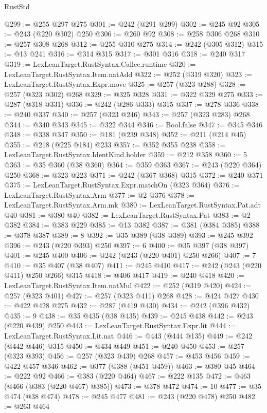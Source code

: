 \begin{lexlean}{RustStd}
\begin{coremodule}
@299 := @255 @297 @275
@301 := @242 (@291 @299)
@302 := @245 @92
@305 := @243 (@220 @302) @250
@306 := @260 @92
@308 := @258 @306 @268
@310 := @257 @308 @268
@312 := @255 @310 @275
@314 := @242 (@305 @312)
@315 := @13 @241
@316 := @314 @315
@317 := @301 @316
@318 := @240 @317
@319 := LexLeanTarget.RustSyntax.Callee.runtime
@320 := LexLeanTarget.RustSyntax.Item.natAdd
@322 := @252 (@319 @320)
@323 := LexLeanTarget.RustSyntax.Expr.move
@325 := @257 (@323 @288)
@328 := @257 (@323 @302) @268
@329 := @325 @328
@331 := @322 @329 @275
@333 := @287 (@318 @331)
@336 := @242 (@286 @333) @315
@337 := @278 @336
@338 := @240 @337
@340 := @257 (@323 @246)
@343 := @257 (@323 @283) @268
@344 := @340 @343
@345 := @322 @344
@346 := Bool.false
@347 := @345 @346
@348 := @338 @347
@350 := @181 (@239 @348)
@352 := @211 (@214 @45)
@355 := @218 (@225 @184) @233
@357 := @352 @355 @238
@358 := LexLeanTarget.RustSyntax.IdentKind.holder
@359 := @212 @358
@360 := 5
@363 := @35 @360 (@38 @360)
@364 := @359 @363
@367 := @243 (@220 @364) @250
@368 := @323 @223
@371 := @242 (@367 @368) @315
@372 := @240 @371
@375 := LexLeanTarget.RustSyntax.Expr.matchOn (@323 @364)
@376 := LexLeanTarget.RustSyntax.Arm
@377 := @2 @376
@378 := LexLeanTarget.RustSyntax.Arm.mk
@380 := LexLeanTarget.RustSyntax.Pat.adt @40
@381 := @380 @40
@382 := LexLeanTarget.RustSyntax.Pat
@383 := @2 @382
@384 := @383 @229
@385 := @13 @382
@387 := @381 (@384 @385)
@388 := @378 @387
@389 := 8
@392 := @35 @389 (@38 @389)
@393 := @245 @392
@396 := @243 (@220 @393) @250
@397 := 6
@400 := @35 @397 (@38 @397)
@401 := @245 @400
@406 := @242 (@243 (@220 @401) @250 @266)
@407 := 7
@410 := @35 @407 (@38 @407)
@411 := @245 @410
@417 := @242 (@243 (@220 @411) @250 @266) @315
@418 := @406 @417
@419 := @240 @418
@420 := LexLeanTarget.RustSyntax.Item.natMul
@422 := @252 (@319 @420)
@424 := @257 (@323 @401)
@427 := @257 (@323 @411) @268
@428 := @424 @427
@430 := @422 @428 @275
@432 := @287 (@419 @430)
@434 := @242 (@396 @432)
@435 := 9
@438 := @35 @435 (@38 @435)
@439 := @245 @438
@442 := @243 (@220 @439) @250
@443 := LexLeanTarget.RustSyntax.Expr.lit
@444 := LexLeanTarget.RustSyntax.Lit.nat
@446 := @443 (@444 @135)
@449 := @242 (@442 @446) @315
@450 := @434 @449
@451 := @240 @450
@453 := @257 (@323 @393)
@456 := @257 (@323 @439) @268
@457 := @453 @456
@459 := @422 @457 @346
@462 := @377 (@388 (@451 @459))
@463 := @380 @45
@464 := @222 @92
@466 := @383 (@220 @464)
@467 := @222 @135
@472 := @463 (@466 (@383 (@220 @467) @385))
@473 := @378 @472
@474 := 10
@477 := @35 @474 (@38 @474)
@478 := @245 @477
@481 := @243 (@220 @478) @250
@482 := @263 @464

\end{coremodule}
\end{lexlean}
